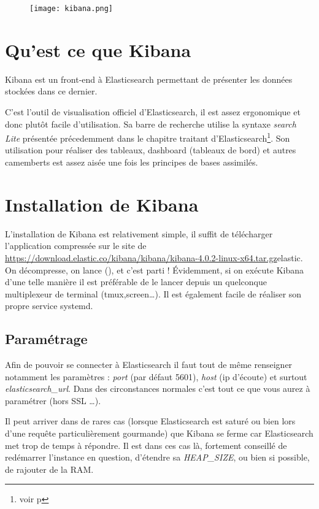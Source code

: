 \begin{figure}[H]
\center
\texttt{[image: kibana.png]}
\label{fig:kibana.png}
\end{figure}
\section{Qu'est ce que Kibana}
Kibana est un front-end à Elasticsearch permettant de présenter les données stockées dans ce dernier. 

C'est l'outil de visualisation officiel d'Elasticsearch, il est assez ergonomique 
et donc plutôt facile d'utilisation. Sa barre de recherche utilise la syntaxe 
\textit{search Lite} présentée précedemment dans le chapitre traitant d'Elasticsearch\footnote{voir p\pageref{subsec:elasticsearchlite}}.
Son utilisation pour réaliser des tableaux, dashboard (tableaux de bord) et autres
camemberts est assez aisée une fois les principes de bases assimilés.



\section{Installation de Kibana}
L'installation de Kibana est relativement simple, il suffit de télécharger l'application
compressée sur le site de \url{https://download.elastic.co/kibana/kibana/kibana-4.0.2-linux-x64.tar.gz}{elastic}.
On décompresse, on lance (), et c'est parti !
Évidemment, si on exécute Kibana d'une telle manière il est préférable de le lancer
depuis un quelconque multiplexeur de terminal (tmux,screen\ldots). 
Il est également facile de réaliser son propre service systemd.

\subsection{Paramétrage}
Afin de pouvoir se connecter à Elasticsearch il faut tout de même renseigner\\
 notamment les paramètres : \emph{port} (par défaut 5601), \emph{host} (ip d'écoute)
et surtout \emph{elasticsearch\_url}.
Dans des circonstances normales c'est tout ce que vous aurez à paramétrer (hors 
SSL \ldots{}).

Il peut arriver dans de rares cas (lorsque Elasticsearch est saturé ou bien lors 
d'une requête particulièrement gourmande) que Kibana se ferme car Elasticsearch met
trop de temps à répondre. Il est dans ces cas là, fortement conseillé de 
redémarrer l'instance en question, d'étendre sa \emph{HEAP\_SIZE}, ou bien si possible, 
de rajouter de la RAM.

